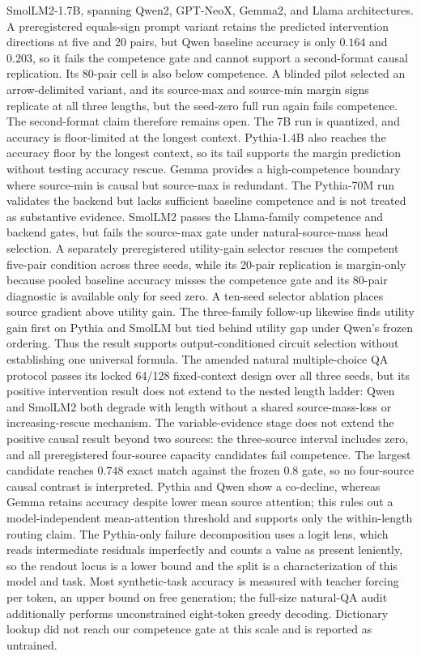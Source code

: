 \documentclass[letterpaper]{article} %
\begin{document}
SmolLM2-1.7B, spanning Qwen2, GPT-NeoX, Gemma2, and Llama architectures.
A preregistered equals-sign prompt variant retains the predicted intervention directions at five and 20
pairs, but Qwen baseline accuracy is only $0.164$ and $0.203$, so it fails the competence gate and cannot
support a second-format causal replication.
Its 80-pair cell is also below competence. A blinded pilot selected an arrow-delimited variant, and its
source-max and source-min margin signs replicate at all three lengths, but the seed-zero full run again
fails competence. The second-format claim therefore remains open.
The 7B run is quantized, and
accuracy is floor-limited at the longest context. Pythia-1.4B also reaches the accuracy floor by the longest
context, so its tail supports the margin prediction without testing accuracy rescue. Gemma provides a
high-competence boundary where source-min is causal but source-max is redundant. The Pythia-70M run validates
the backend but lacks sufficient baseline competence and is not treated as substantive evidence. SmolLM2
passes the Llama-family competence and backend gates, but fails the source-max gate under natural-source-mass
head selection. A separately preregistered utility-gain selector rescues the competent five-pair condition
across three seeds, while its 20-pair replication is margin-only because pooled baseline accuracy misses the
competence gate and its 80-pair diagnostic is available only for seed zero. A ten-seed selector ablation
places source gradient above utility gain. The three-family follow-up likewise finds utility gain first on
Pythia and SmolLM but tied behind utility gap under Qwen's frozen ordering. Thus the result supports
output-conditioned circuit selection without establishing one universal formula.
The amended natural multiple-choice QA protocol passes its locked 64/128 fixed-context design over all three
seeds, but its positive intervention result does not extend to the nested length ladder: Qwen and SmolLM2
both degrade with length without a shared source-mass-loss or increasing-rescue mechanism. The
variable-evidence stage does not extend the positive causal result beyond two sources: the three-source
interval includes zero, and all preregistered four-source capacity candidates fail competence. The largest
candidate reaches $0.748$ exact match against the frozen $0.8$ gate, so no four-source causal contrast is
interpreted.
Pythia and Qwen show a co-decline, whereas Gemma retains accuracy despite lower mean source attention; this
rules out a model-independent mean-attention threshold and supports only the within-length routing claim.
The Pythia-only failure decomposition uses a logit lens, which reads intermediate residuals imperfectly and
counts a value as present leniently, so the readout locus is a lower bound and the split is a characterization
of this model and task.
Most synthetic-task accuracy is measured with teacher forcing per token, an upper bound on free generation;
the full-size natural-QA audit additionally performs unconstrained eight-token greedy decoding.
Dictionary lookup did not reach our competence gate at this scale and is reported as untrained.
\end{document}
